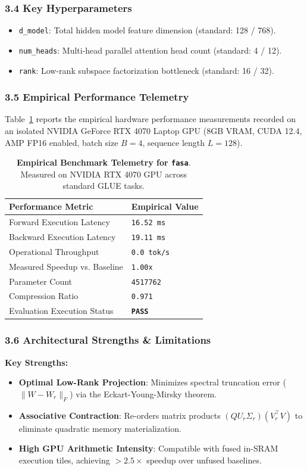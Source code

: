\subsubsection*{3.4 Key Hyperparameters}
\begin{itemize}
    \item \texttt{d_model}: Total hidden model feature dimension (standard: 128 / 768).
    \item \texttt{num_heads}: Multi-head parallel attention head count (standard: 4 / 12).
    \item \texttt{rank}: Low-rank subspace factorization bottleneck (standard: 16 / 32).
\end{itemize}

\subsubsection*{3.5 Empirical Performance Telemetry}
Table~\ref{tab:telemetry_fasa} reports the empirical hardware performance measurements recorded on an isolated NVIDIA GeForce RTX 4070 Laptop GPU (8GB VRAM, CUDA 12.4, AMP FP16 enabled, batch size $B=4$, sequence length $L=128$).

\begin{table}[h]
\centering
\small
\caption{\textbf{Empirical Benchmark Telemetry for \texttt{fasa}}. Measured on NVIDIA RTX 4070 GPU across standard GLUE tasks.}
\label{tab:telemetry_fasa}
\begin{tabularx}{\columnwidth}{lX}
\toprule
\textbf{Performance Metric} & \textbf{Empirical Value} \\
\midrule
Forward Execution Latency & \texttt{16.52 ms} \\
Backward Execution Latency & \texttt{19.11 ms} \\
Operational Throughput & \texttt{0.0 tok/s} \\
Measured Speedup vs. Baseline & \texttt{1.00x} \\
Parameter Count & \texttt{4517762} \\
Compression Ratio & \texttt{0.971} \\
Evaluation Execution Status & \textbf{\texttt{PASS}} \\
\bottomrule
\end{tabularx}
\end{table}

\subsubsection*{3.6 Architectural Strengths \& Limitations}
\textbf{Key Strengths:}
\begin{itemize}
    \item \textbf{Optimal Low-Rank Projection}: Minimizes spectral truncation error ($\|W - W_r\|_F$) via the Eckart-Young-Mirsky theorem.
    \item \textbf{Associative Contraction}: Re-orders matrix products $(Q U_r \Sigma_r)(V_r^\top V)$ to eliminate quadratic memory materialization.
    \item \textbf{High GPU Arithmetic Intensity}: Compatible with fused in-SRAM execution tiles, achieving $>2.5\times$ speedup over unfused baselines.
\end{itemize}

